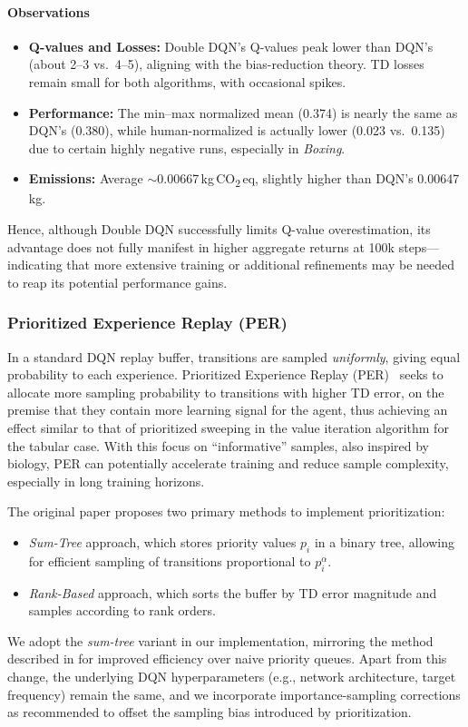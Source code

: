 \paragraph{Observations}
\begin{itemize}
	\item \textbf{Q-values and Losses:} Double DQN's Q-values peak lower than DQN's (about 2--3 vs.\ 4--5), aligning with the bias-reduction theory. TD losses remain small for both algorithms, with occasional spikes.
	\item \textbf{Performance:} The min--max normalized mean (\num{0.374}) is nearly the same as DQN's (\num{0.380}), while human-normalized is actually lower (\num{0.023} vs.\ \num{0.135}) due to certain highly negative runs, especially in \emph{Boxing}.
	\item \textbf{Emissions:} Average $\sim$\num{0.00667}\,kg\,CO\textsubscript{2}\,eq, slightly higher than DQN's \num{0.00647}\,kg.
\end{itemize}

Hence, although Double DQN successfully limits Q-value overestimation, its advantage does not 
fully manifest in higher aggregate returns at 100k steps—indicating that more extensive training 
or additional refinements may be needed to reap its potential performance gains.


\subsubsection{Prioritized Experience Replay (PER)}
\label{subsubsec:per}
In a standard DQN replay buffer, transitions are sampled \emph{uniformly}, giving equal 
probability to each experience. Prioritized Experience Replay (PER)~\cite{schaul:prioritized} 
seeks to allocate more sampling probability to transitions with higher TD error, 
on the premise that they contain more learning signal for the agent, thus achieving an effect
similar to that of prioritized sweeping in the value iteration algorithm for the tabular case.
With this focus on “informative” samples, also inspired by biology, PER can potentially
accelerate training and reduce sample complexity, especially in long training horizons.

The original paper proposes two primary methods to implement prioritization:
\begin{itemize}
	\item \textit{Sum-Tree} approach, which stores priority values $p_i$ in a binary tree, 
	allowing for efficient sampling of transitions proportional to $p_i^\alpha$.
	\item \textit{Rank-Based} approach, which sorts the buffer by TD error magnitude 
	and samples according to rank orders.
\end{itemize}
We adopt the \emph{sum-tree} variant in our implementation, 
mirroring the method described in \cite{schaul:prioritized} 
for improved efficiency over naive priority queues. 
Apart from this change, the underlying DQN hyperparameters 
(e.g., network architecture, target frequency) remain the same, 
and we incorporate importance-sampling corrections as recommended 
to offset the sampling bias introduced by prioritization.

